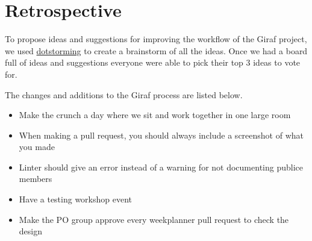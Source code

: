 \section{Retrospective}
To propose ideas and suggestions for improving the workflow of the Giraf project, we used \href{https://dotstorming.com/}{dotstorming} to create a brainstorm of all the ideas. 
Once we had a board full of ideas and suggestions everyone were able to pick their top 3 ideas to vote for.

The changes and additions to the Giraf process are listed below.

\begin{itemize}
  \item Make the crunch a day where we sit and work together in one large room
  \item When making a pull request, you should always include a screenshot of what you made
  \item Linter should give an error instead of a warning for not documenting publice members
  \item Have a testing workshop event
  \item Make the PO group approve every weekplanner pull request to check the design
\end{itemize}
